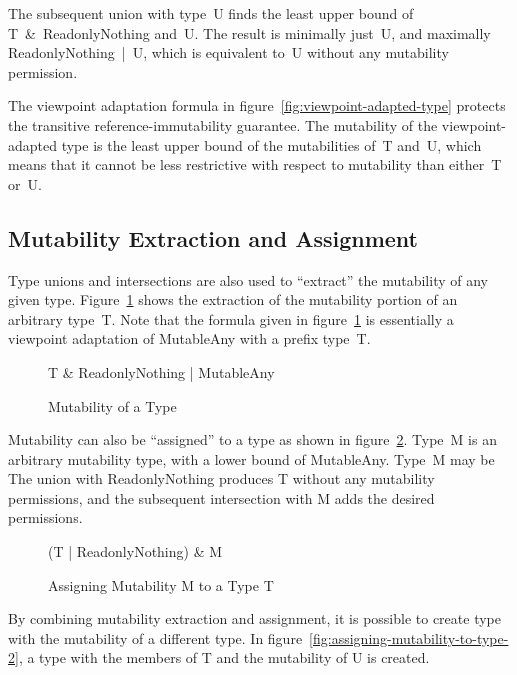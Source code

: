 The subsequent union with type~{\cd U} finds the least upper bound of \mbox{\cd T \& ReadonlyNothing} and~{\cd U}. The result is minimally just~{\cd U}, and maximally \mbox{\cd ReadonlyNothing | U}, which is equivalent to~{\cd U} without any mutability permission.

The viewpoint adaptation formula in figure~\ref{fig:viewpoint-adapted-type} protects the transitive reference-immutability guarantee.
The mutability of the viewpoint-adapted type is the least upper bound of the mutabilities of~{\cd T} and~{\cd U}, which means that it cannot be less restrictive with respect to mutability than either~{\cd T} or~{\cd U}.

\subsection{Mutability Extraction and Assignment}

Type unions and intersections are also used to ``extract'' the mutability of any given type.
Figure~\ref{fig:mutability-of-type} shows the extraction of the mutability portion of an arbitrary type~{\cd T}.
Note that the formula given in figure~\ref{fig:mutability-of-type} is essentially a viewpoint adaptation of {\cd MutableAny} with a prefix type~{\cd T}.

\begin{figure}[h]
\center
{\cd T \& ReadonlyNothing | MutableAny}
\caption{Mutability of a Type}
\label{fig:mutability-of-type}
\end{figure}

Mutability can also be ``assigned'' to a type as shown in figure~\ref{fig:assigning-mutability-to-type}.
Type~{\cd M} is an arbitrary mutability type, with a lower bound of {\cd MutableAny}. Type~{\cd M} may be 
The union with {\cd ReadonlyNothing} produces {\cd T} without any mutability permissions, and the subsequent intersection with {\cd M} adds the desired permissions.

\begin{figure}[h]
\center
{\cd (T | ReadonlyNothing) \& M} \\
\caption{Assigning Mutability {\cd M} to a Type {\cd T}}
\label{fig:assigning-mutability-to-type}
\end{figure}

By combining mutability extraction and assignment, it is possible to create type with the mutability of a different type. In figure~\ref{fig:assigning-mutability-to-type-2}, a type with the members of {\cd T} and the mutability of {\cd U} is created.

